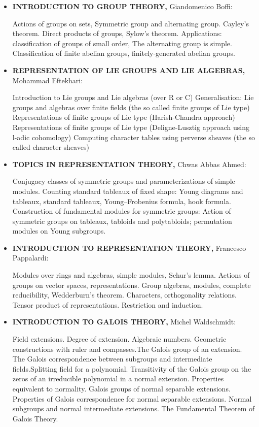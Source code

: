 \documentclass[12pt,a4paper]{scrartcl}
\begin{document}
\begin{itemize}


\item\textbf{INTRODUCTION TO GROUP THEORY,}
Giandomenico Boffi:\bigskip

Actions of groups on sets, Symmetric group and alternating group. Cayley's theorem. Direct products of groups, Sylow's theorem. Applications: classification of groups of small order, The alternating group is simple. Classification of finite abelian groups, finitely-generated abelian groups. 

\item\textbf{REPRESENTATION OF LIE GROUPS AND LIE ALGEBRAS,}
Mohammad Eftekhari:\bigskip

Introduction to Lie groups and Lie algebras (over R or C) Generalisation: Lie groups and algebras over finite fields (the so called finite groups of Lie type) Representations of finite groups of Lie type (Harish-Chandra approach) Representations of finite groups of Lie type (Deligne-Lusztig approach using l-adic cohomology) Computing character tables using perverse sheaves (the so called character sheaves) 

\item\textbf{TOPICS IN REPRESENTATION THEORY,}
Chwas Abbas Ahmed:\bigskip

Conjugacy classes of symmetric groups and parameterizations of simple modules. Counting standard tableaux of fixed shape: Young diagrams and tableaux, standard tableaux, Young--Frobenius formula, hook formula. Construction of fundamental modules for symmetric groups: Action of symmetric groups on tableaux, tabloids and polytabloids; permutation modules on Young subgroups. 

 \item \textbf{INTRODUCTION TO REPRESENTATION THEORY,}
Francesco Pappalardi:\bigskip

Modules over rings and algebras, simple modules, Schur's lemma. Actions of groups on vector spaces, representations. Group algebras, modules, complete reducibility, Wedderburn's theorem. Characters, orthogonality relations. Tensor product of representations. Restriction and induction.

\item \textbf{INTRODUCTION TO GALOIS THEORY,}
Michel Waldschmidt:\bigskip

Field extensions. Degree of extension. Algebraic numbers. Geometric constructions with ruler and compasses.The Galois group of an extension. The Galois correspondence between subgroups and intermediate fields.Splitting field for a polynomial. Transitivity of the Galois group on the zeros of an irreducible polynomial in a normal extension. Properties equivalent to normality. Galois groups of normal separable extensions. Properties of Galois correspondence for normal separable extensions. Normal subgroups and normal intermediate extensions. The Fundamental Theorem of Galois Theory. 
\end{itemize}
\end{document}
